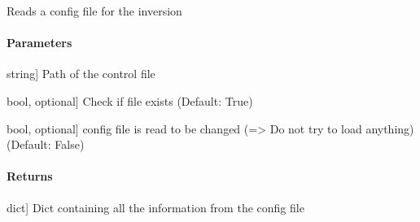 \documentclass[letterpaper,10pt,english]{sphinxmanual}
\begin{document}

\begin{fulllineitems}
\label{\detokenize{functions:sir.read_config}}
\pysigstartsignatures
{}
\pysigstopsignatures
\sphinxAtStartPar
Reads a config file for the inversion


\paragraph{Parameters}
\label{\detokenize{functions:parameters}}\begin{description}
\sphinxlineitem{filename}{[}string{]}
\sphinxAtStartPar
Path of the control file

\sphinxlineitem{check}{[}bool, optional{]}
\sphinxAtStartPar
Check if file exists (Default: True)

\sphinxlineitem{change\_config}{[}bool, optional{]}
\sphinxAtStartPar
config file is read to be changed (=\textgreater{} Do not try to load anything) (Default: False)

\end{description}


\paragraph{Returns}
\label{\detokenize{functions:returns}}\begin{description}
\sphinxlineitem{Dict}{[}dict{]}
\sphinxAtStartPar
Dict containing all the information from the config file

\end{description}

\end{fulllineitems}

\end{document}
